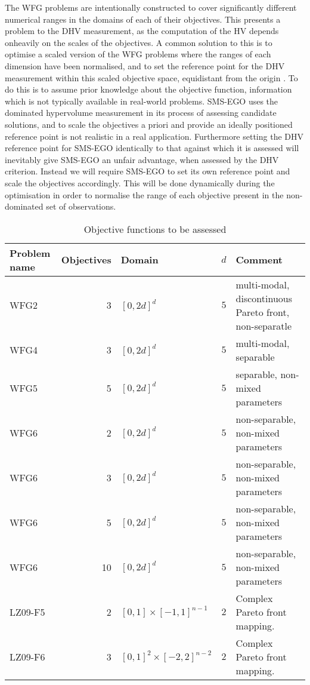 \documentclass[runningheads]{llncs}
\begin{document}
The WFG problems are intentionally constructed to cover significantly different numerical ranges in the domains of each of their objectives. This presents a problem to the DHV measurement, as the computation of the HV depends onheavily on the scales of the objectives. A common solution to this is to optimise a scaled version of the WFG problems where the ranges of each dimension have been normalised, and to set the reference point for the DHV measurement within this scaled objective space, equidistant from the origin \cite{}. To do this is to assume prior knowledge about the objective function, information which is not typically available in real-world problems. SMS-EGO uses the dominated hypervolume measurement in its process of assessing candidate solutions, and to scale the objectives a priori and provide an ideally positioned reference point is not realistic in a real application. Furthermore setting the DHV reference point for SMS-EGO identically to that against which it is assessed will inevitably give SMS-EGO an unfair advantage, when assessed by the DHV criterion. Instead we will require SMS-EGO to set its own reference point and scale the objectives accordingly. This will be done dynamically during the optimisation in order to normalise the range of each objective present in the non-dominated set of observations. 


\begin{table}
    \caption{Objective functions to be assessed}\label{tab2}
    \begin{tabular}{|l|r|l|r|l|}
        \hline
        Problem name &  Objectives & Domain & $d$ & Comment\\
        \hline
        WFG2 & 3 & $[0, 2d]^d$ & $5$ & multi-modal, discontinuous Pareto front, non-separatle\\
        WFG4 & 3 & $[0, 2d]^d$ & $5$ & multi-modal, separable\\
        WFG5 & 5 & $[0, 2d]^d$ & $5$ & separable, non-mixed parameters\\
        WFG6 & 2 & $[0, 2d]^d$ & $5$ & non-separable, non-mixed parameters\\
        WFG6 & 3 & $[0, 2d]^d$ & $5$ & non-separable, non-mixed parameters\\
        WFG6 & 5 & $[0, 2d]^d$ & $5$ & non-separable, non-mixed parameters\\
        WFG6 & 10 & $[0, 2d]^d$ & $5$ & non-separable, non-mixed parameters\\
        LZ09-F5 & 2 & $[0,1] \times [-1,1]^{n-1}$ & $2$ & Complex Pareto front mapping. \\
        LZ09-F6 & 3 & $[0,1]^2 \times [-2,2]^{n-2}$ & $2$ &Complex Pareto front mapping.\\
        \hline
    \end{tabular}
\end{table}
\end{document}

